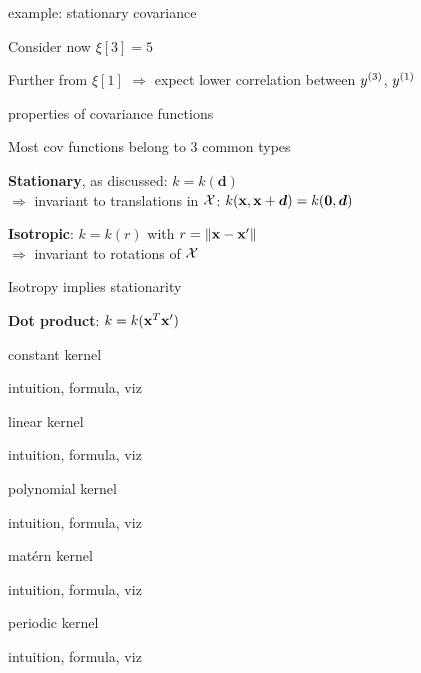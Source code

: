 \documentclass[11pt,compress,t,notes=noshow, xcolor=table]{beamer}
\begin{document}
\begin{framei}{example: stationary covariance}
\item Consider now $\xi[3] = 5$
\item Further from $\xi[1]$ $\Rightarrow$ expect lower correlation between $\yi[3]$, $\yi[1]$ 
\vfill
{}
\end{framei}

\begin{framei}[sep=L]{properties of covariance functions}
\item Most cov functions belong to 3 common types
\item \textbf{Stationary}, as discussed: $k = k(\bm{d})$ \\
$\Rightarrow$ invariant to translations in $\Xspace$: $k(\xv, \xv + \bm{d}) = k(\zero, \bm{d})$
\item \textbf{Isotropic}: $k = k(r)$ with $r = \| \xv - \xv^\prime \|$ \\
$\Rightarrow$ invariant to rotations of $\Xspace$
\item Isotropy implies stationarity
\item \textbf{Dot product}: $k = k(\xv^T \xv^\prime)$
\end{framei}

\begin{framei}[sep=L]{constant kernel}
\item intuition, formula, viz
\end{framei}

\begin{framei}[sep=L]{linear kernel}
\item intuition, formula, viz
\end{framei}

\begin{framei}[sep=L]{polynomial kernel}
\item intuition, formula, viz
\end{framei}

\begin{framei}[sep=L]{matérn kernel}
\item intuition, formula, viz
\end{framei}

\begin{framei}[sep=L]{periodic kernel}
\item intuition, formula, viz
\end{framei}
\end{document}
